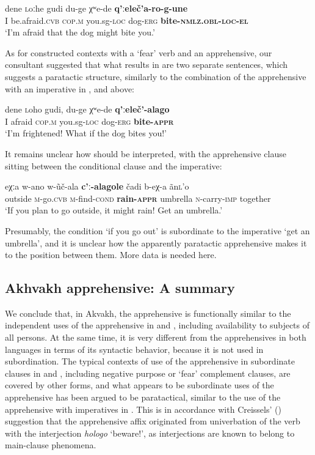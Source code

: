 \documentclass[output=paper,colorlinks,citecolor=brown]{langscibook}
\begin{document}
\ea \label{ex:DD75}
\gll dene \textsc{l}oːhe gudi du-ge χʷe-de \textbf{q'ːeleč'a-ro-g-une} \\
I be.afraid.\textsc{cvb} \textsc{cop.m} you.sg\textsc{-loc} dog-\textsc{erg} \textbf{bite-\textsc{nmlz.obl-loc-el}} \\
\glt `I'm afraid that the dog might bite you.'
\z


As for constructed contexts with a `fear' verb and an apprehensive, our consultant suggested that what results in  are two separate sentences, which suggests a paratactic structure, similarly to the combination of the apprehensive with an imperative in ,  and  above:


\ea \label{ex:DD76}
\gll dene \textsc{l}oho gudi, du-ge χʷe-de \textbf{q'ːeleč'-alago} \\
I afraid \textsc{cop.m} you.sg\textsc{-loc} dog-\textsc{erg} \textbf{bite-\textsc{appr}} \\
\glt `I'm frightened! What if the dog bites you!'
\z



 It remains unclear how  should be interpreted, with the apprehensive clause sitting between the conditional clause and the imperative:


\ea \label{ex:DD77}
\gll eχːa w-ano w-\~uč-ala \textbf{c'ː-alagole} čadi b-eχ-a \~an\textsc{l}'o \\
outside \textsc{m}-go.\textsc{cvb} \textsc{m}-find-\textsc{cond} \textbf{rain-\textsc{appr}} umbrella \textsc{n}-carry-\textsc{imp} together \\
\glt `If you plan to go outside, it might rain! Get an umbrella.'
\z



\noindent Presumably, the condition `if you go out' is subordinate to the imperative `get an umbrella', and it is unclear how the apparently paratactic apprehensive makes it to the position between them. More data is needed here.
 

\subsection{Akhvakh apprehensive: A summary}
\label{subsec:NAapprehensive}
 
We conclude that, in Akvakh, the apprehensive is functionally similar to the independent uses of the apprehensive in  and , including availability to subjects of all persons. At the same time, it is very different from the apprehensives in both languages in terms of its syntactic behavior, because it is not used in subordination. The typical contexts of use of the apprehensive in subordinate clauses in  and , including negative purpose or `fear' complement clauses, are covered by other forms, and what appears to be subordinate uses of the apprehensive has been argued to be paratactical, similar to the use of the apprehensive with imperatives in . This is in accordance with Creissels' (\citeyear{Creisselsunpublished2}) suggestion that the apprehensive affix originated from univerbation of the verb with the interjection \textit{hologo} `beware!', as interjections are known to belong to main-clause phenomena. 
\end{document}

